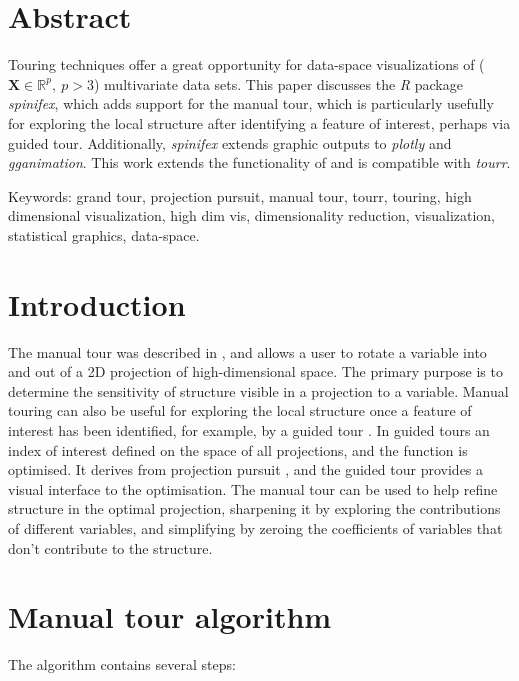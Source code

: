 \documentclass{monashthesis}
\begin{document}
\section{Abstract}\label{abstract-1}

Touring techniques offer a great opportunity for data-space
visualizations of (\(\textbf{X} \in \mathbb{R}^p,~p > 3\)) multivariate
data sets. This paper discusses the \emph{R} package \emph{spinifex},
which adds support for the manual tour, which is particularly usefully
for exploring the local structure after identifying a feature of
interest, perhaps via guided tour. Additionally, \emph{spinifex} extends
graphic outputs to \emph{plotly} and \emph{gganimation}. This work
extends the functionality of and is compatible with \emph{tourr}.

Keywords: grand tour, projection pursuit, manual tour, tourr, touring,
high dimensional visualization, high dim vis, dimensionality reduction,
visualization, statistical graphics, data-space.

\section{Introduction}\label{introduction}

The manual tour was described in \textcite{cook_manual_1997}, and allows
a user to rotate a variable into and out of a 2D projection of
high-dimensional space. The primary purpose is to determine the
sensitivity of structure visible in a projection to a variable. Manual
touring can also be useful for exploring the local structure once a
feature of interest has been identified, for example, by a guided tour
\autocite{hurley_analyzing_1990}. In guided tours an index of interest
defined on the space of all projections, and the function is optimised.
It derives from projection pursuit \autocite{friedman_projection_1974},
and the guided tour provides a visual interface to the optimisation. The
manual tour can be used to help refine structure in the optimal
projection, sharpening it by exploring the contributions of different
variables, and simplifying by zeroing the coefficients of variables that
don't contribute to the structure.

\section{Manual tour algorithm}\label{manual-tour-algorithm}

The algorithm contains several steps:
\end{document}
